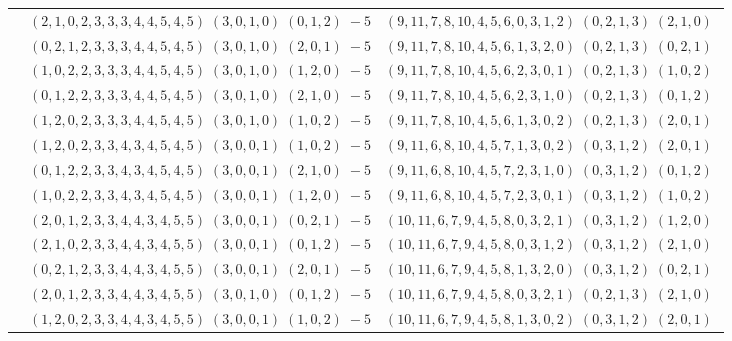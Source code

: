 \documentclass[11pt]{article}
\begin{document}
\begin{longtable}[l]{|c|c|c|}
 \cline{2-3} 
 & $(2 ,1 ,0 ,2 ,3 ,3 ,3 ,4 ,4 ,5 ,4 ,5) \;(3 ,0 ,1 ,0) \;(0 ,1 ,2) \;-5$ & $(9 ,11 ,7 ,8 ,10 ,4 ,5 ,6 ,0 ,3 ,1 ,2) \;(0 ,2 ,1 ,3) \;(2 ,1 ,0) \;$\\ 
 \cline{2-3} 
 & $(0 ,2 ,1 ,2 ,3 ,3 ,3 ,4 ,4 ,5 ,4 ,5) \;(3 ,0 ,1 ,0) \;(2 ,0 ,1) \;-5$ & $(9 ,11 ,7 ,8 ,10 ,4 ,5 ,6 ,1 ,3 ,2 ,0) \;(0 ,2 ,1 ,3) \;(0 ,2 ,1) \;$\\ 
 \cline{2-3} 
 & $(1 ,0 ,2 ,2 ,3 ,3 ,3 ,4 ,4 ,5 ,4 ,5) \;(3 ,0 ,1 ,0) \;(1 ,2 ,0) \;-5$ & $(9 ,11 ,7 ,8 ,10 ,4 ,5 ,6 ,2 ,3 ,0 ,1) \;(0 ,2 ,1 ,3) \;(1 ,0 ,2) \;$\\ 
 \cline{2-3} 
 & $(0 ,1 ,2 ,2 ,3 ,3 ,3 ,4 ,4 ,5 ,4 ,5) \;(3 ,0 ,1 ,0) \;(2 ,1 ,0) \;-5$ & $(9 ,11 ,7 ,8 ,10 ,4 ,5 ,6 ,2 ,3 ,1 ,0) \;(0 ,2 ,1 ,3) \;(0 ,1 ,2) \;$\\ 
 \cline{2-3} 
 & $(1 ,2 ,0 ,2 ,3 ,3 ,3 ,4 ,4 ,5 ,4 ,5) \;(3 ,0 ,1 ,0) \;(1 ,0 ,2) \;-5$ & $(9 ,11 ,7 ,8 ,10 ,4 ,5 ,6 ,1 ,3 ,0 ,2) \;(0 ,2 ,1 ,3) \;(2 ,0 ,1) \;$\\ 
 \cline{2-3} 
 & $(1 ,2 ,0 ,2 ,3 ,3 ,4 ,3 ,4 ,5 ,4 ,5) \;(3 ,0 ,0 ,1) \;(1 ,0 ,2) \;-5$ & $(9 ,11 ,6 ,8 ,10 ,4 ,5 ,7 ,1 ,3 ,0 ,2) \;(0 ,3 ,1 ,2) \;(2 ,0 ,1) \;$\\ 
 \cline{2-3} 
 & $(0 ,1 ,2 ,2 ,3 ,3 ,4 ,3 ,4 ,5 ,4 ,5) \;(3 ,0 ,0 ,1) \;(2 ,1 ,0) \;-5$ & $(9 ,11 ,6 ,8 ,10 ,4 ,5 ,7 ,2 ,3 ,1 ,0) \;(0 ,3 ,1 ,2) \;(0 ,1 ,2) \;$\\ 
 \cline{2-3} 
 & $(1 ,0 ,2 ,2 ,3 ,3 ,4 ,3 ,4 ,5 ,4 ,5) \;(3 ,0 ,0 ,1) \;(1 ,2 ,0) \;-5$ & $(9 ,11 ,6 ,8 ,10 ,4 ,5 ,7 ,2 ,3 ,0 ,1) \;(0 ,3 ,1 ,2) \;(1 ,0 ,2) \;$\\ 
 \cline{2-3} 
 & $(2 ,0 ,1 ,2 ,3 ,3 ,4 ,4 ,3 ,4 ,5 ,5) \;(3 ,0 ,0 ,1) \;(0 ,2 ,1) \;-5$ & $(10 ,11 ,6 ,7 ,9 ,4 ,5 ,8 ,0 ,3 ,2 ,1) \;(0 ,3 ,1 ,2) \;(1 ,2 ,0) \;$\\ 
 \cline{2-3} 
 & $(2 ,1 ,0 ,2 ,3 ,3 ,4 ,4 ,3 ,4 ,5 ,5) \;(3 ,0 ,0 ,1) \;(0 ,1 ,2) \;-5$ & $(10 ,11 ,6 ,7 ,9 ,4 ,5 ,8 ,0 ,3 ,1 ,2) \;(0 ,3 ,1 ,2) \;(2 ,1 ,0) \;$\\ 
 \cline{2-3} 
 & $(0 ,2 ,1 ,2 ,3 ,3 ,4 ,4 ,3 ,4 ,5 ,5) \;(3 ,0 ,0 ,1) \;(2 ,0 ,1) \;-5$ & $(10 ,11 ,6 ,7 ,9 ,4 ,5 ,8 ,1 ,3 ,2 ,0) \;(0 ,3 ,1 ,2) \;(0 ,2 ,1) \;$\\ 
 \cline{2-3} 
 & $(2 ,0 ,1 ,2 ,3 ,3 ,4 ,4 ,3 ,4 ,5 ,5) \;(3 ,0 ,1 ,0) \;(0 ,1 ,2) \;-5$ & $(10 ,11 ,6 ,7 ,9 ,4 ,5 ,8 ,0 ,3 ,2 ,1) \;(0 ,2 ,1 ,3) \;(2 ,1 ,0) \;$\\ 
 \cline{2-3} 
 & $(1 ,2 ,0 ,2 ,3 ,3 ,4 ,4 ,3 ,4 ,5 ,5) \;(3 ,0 ,0 ,1) \;(1 ,0 ,2) \;-5$ & $(10 ,11 ,6 ,7 ,9 ,4 ,5 ,8 ,1 ,3 ,0 ,2) \;(0 ,3 ,1 ,2) \;(2 ,0 ,1) \;$\\ 

\end{longtable}
\end{document}
